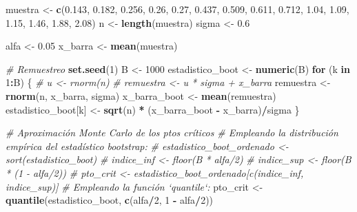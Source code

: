 \documentclass[]{book}
\newenvironment{Shaded}{\begin{snugshade}}{\end{snugshade}}
\newcommand{\KeywordTok}[1]{\textcolor[rgb]{0.13,0.29,0.53}{\textbf{#1}}}
\newcommand{\DecValTok}[1]{\textcolor[rgb]{0.00,0.00,0.81}{#1}}
\newcommand{\FloatTok}[1]{\textcolor[rgb]{0.00,0.00,0.81}{#1}}
\newcommand{\StringTok}[1]{\textcolor[rgb]{0.31,0.60,0.02}{#1}}
\newcommand{\CommentTok}[1]{\textcolor[rgb]{0.56,0.35,0.01}{\textit{#1}}}
\newcommand{\ControlFlowTok}[1]{\textcolor[rgb]{0.13,0.29,0.53}{\textbf{#1}}}
\newcommand{\OperatorTok}[1]{\textcolor[rgb]{0.81,0.36,0.00}{\textbf{#1}}}
\newcommand{\NormalTok}[1]{#1}
\theoremstyle{break}
\theoremstyle{definition}
\theoremstyle{definition}
\theoremstyle{definition}
\theoremstyle{remark}
\begin{document}
\begin{Shaded}
\begin{Highlighting}[]
\NormalTok{muestra <-}\StringTok{ }\KeywordTok{c}\NormalTok{(}\FloatTok{0.143}\NormalTok{, }\FloatTok{0.182}\NormalTok{, }\FloatTok{0.256}\NormalTok{, }\FloatTok{0.26}\NormalTok{, }\FloatTok{0.27}\NormalTok{, }\FloatTok{0.437}\NormalTok{, }\FloatTok{0.509}\NormalTok{, }
             \FloatTok{0.611}\NormalTok{, }\FloatTok{0.712}\NormalTok{, }\FloatTok{1.04}\NormalTok{, }\FloatTok{1.09}\NormalTok{, }\FloatTok{1.15}\NormalTok{, }\FloatTok{1.46}\NormalTok{, }\FloatTok{1.88}\NormalTok{, }\FloatTok{2.08}\NormalTok{)}
\NormalTok{n <-}\StringTok{ }\KeywordTok{length}\NormalTok{(muestra)}
\NormalTok{sigma <-}\StringTok{ }\FloatTok{0.6}

\NormalTok{alfa <-}\StringTok{ }\FloatTok{0.05}
\NormalTok{x_barra <-}\StringTok{ }\KeywordTok{mean}\NormalTok{(muestra)}

\CommentTok{# Remuestreo}
\KeywordTok{set.seed}\NormalTok{(}\DecValTok{1}\NormalTok{)}
\NormalTok{B <-}\StringTok{ }\DecValTok{1000}
\NormalTok{estadistico_boot <-}\StringTok{ }\KeywordTok{numeric}\NormalTok{(B)}
\ControlFlowTok{for}\NormalTok{ (k }\ControlFlowTok{in} \DecValTok{1}\OperatorTok{:}\NormalTok{B) \{}
    \CommentTok{# u <- rnorm(n)}
    \CommentTok{# remuestra <- u * sigma + x_barra}
\NormalTok{    remuestra <-}\StringTok{ }\KeywordTok{rnorm}\NormalTok{(n, x_barra, sigma)}
\NormalTok{    x_barra_boot <-}\StringTok{ }\KeywordTok{mean}\NormalTok{(remuestra)}
\NormalTok{    estadistico_boot[k] <-}\StringTok{ }\KeywordTok{sqrt}\NormalTok{(n) }\OperatorTok{*}\StringTok{ }\NormalTok{(x_barra_boot }\OperatorTok{-}\StringTok{ }\NormalTok{x_barra)}\OperatorTok{/}\NormalTok{sigma}
\NormalTok{\}}

\CommentTok{# Aproximación Monte Carlo de los ptos críticos}
\CommentTok{# Empleando la distribución empírica del estadístico bootstrap: }
    \CommentTok{# estadistico_boot_ordenado <- sort(estadistico_boot)}
    \CommentTok{# indice_inf <- floor(B * alfa/2)}
    \CommentTok{# indice_sup <- floor(B * (1 - alfa/2))}
    \CommentTok{# pto_crit <- estadistico_boot_ordenado[c(indice_inf, indice_sup)]}
\CommentTok{# Empleando la función `quantile`:}
\NormalTok{pto_crit <-}\StringTok{ }\KeywordTok{quantile}\NormalTok{(estadistico_boot, }\KeywordTok{c}\NormalTok{(alfa}\OperatorTok{/}\DecValTok{2}\NormalTok{, }\DecValTok{1} \OperatorTok{-}\StringTok{ }\NormalTok{alfa}\OperatorTok{/}\DecValTok{2}\NormalTok{))}


\end{Highlighting}
\end{Shaded}
\end{document}
